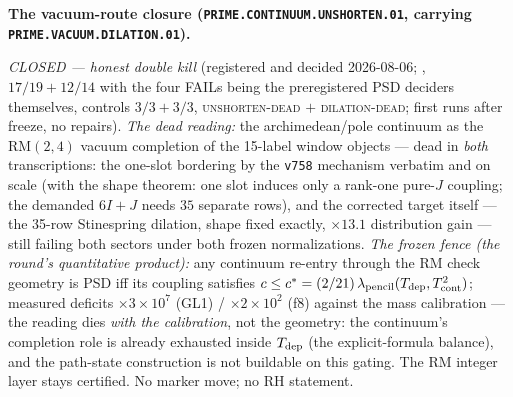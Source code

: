 \documentclass[11pt,a4paper]{article}
\begin{document}
\par\smallskip\noindent\textbf{The vacuum-route closure
(\texttt{PRIME.CONTINUUM.UNSHORTEN.01}, carrying
\texttt{PRIME.VACUUM.DILATION.01}).}
{\sloppy
\emph{CLOSED --- honest double kill} (registered and decided
2026-08-06; , $17/19 +
12/14$ with the four FAILs being the preregistered PSD deciders
themselves, controls $3/3+3/3$, \textsc{unshorten-dead} $+$
\textsc{dilation-dead}; first runs after freeze, no repairs).
\emph{The dead reading:} the archimedean/pole continuum as the
$\mathrm{RM}(2,4)$ vacuum completion of the 15-label window
objects --- dead in \emph{both} transcriptions: the one-slot
bordering by the \texttt{v758} mechanism verbatim and on scale
(with the shape theorem: one slot induces only a rank-one
pure-$J$ coupling; the demanded $6I{+}J$ needs $35$ separate
rows), and the corrected target itself --- the 35-row Stinespring
dilation, shape fixed exactly, $\times13.1$ distribution gain ---
still failing both sectors under both frozen normalizations.
\emph{The frozen fence (the round's quantitative product):} any
continuum re-entry through the RM check geometry is PSD iff its
coupling satisfies $c\le c^*=(2/21)\,\lambda_{\rm pencil}
(T_{\rm dep},T_{\rm cont}^2)$; measured deficits
$\times3\times10^7$ (GL1) / $\times2\times10^2$ (f8) against the
mass calibration --- the reading dies \emph{with the
calibration}, not the geometry: the continuum's completion role
is already exhausted inside $T_{\rm dep}$ (the explicit-formula
balance), and the path-state construction is not buildable on
this gating.  The RM integer layer stays certified.  No marker
move; no RH statement.\par}
\end{document}
